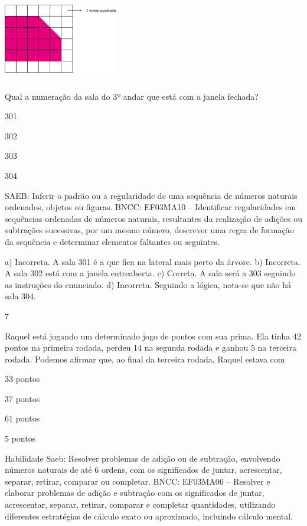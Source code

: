 \begin{multicols}{2}
{\begin{escolha}
{%

\includegraphics[width=1.96154in,height=1.44792in]{media/image108.png}

Qual a numeração da sala do 3º andar que está com a janela fechada?

\begin{escolha}
\item
  301
\item
  302
\item
  303
\item
  304
\end{escolha}

SAEB: Inferir o padrão ou a regularidade de uma sequência de
números naturais ordenados, objetos ou figuras.
BNCC: EF03MA10 -- Identificar regularidades em sequências ordenadas de números naturais,
resultantes da realização de adições ou subtrações sucessivas, por um mesmo número,
descrever uma regra de formação da sequência e determinar elementos faltantes ou seguintes.

a) Incorreta. A sala 301 é a que fica na lateral mais perto da árvore.
b) Incorreta. A sala 302 está com a janela entreaberta.
c) Correta. A sala será a 303 seguindo as instruções do enunciado.
d) Incorreta. Seguindo a lógica, nota-se que não há sala 304.

\num{7}

Raquel está jogando um determinado jogo de pontos com sua prima. Ela
tinha 42 pontos na primeira rodada, perdeu 14 na segunda rodada e ganhou
5 na terceira rodada. Podemos afirmar que, ao final da terceira rodada, Raquel estava com

\begin{escolha}
\item
  33 pontos
\item
  37 pontos
\item
  61 pontos
\item
  5 pontos
\end{escolha}

Habilidade Saeb: Resolver problemas de adição ou de subtração,
envolvendo números naturais de até 6 ordens, com os significados de
juntar, acrescentar, separar, retirar, comparar ou completar.
BNCC: EF03MA06 – Resolver e elaborar problemas de adição e subtração com os significados de
juntar, acrescentar, separar, retirar, comparar e completar quantidades, utilizando diferentes
estratégias de cálculo exato ou aproximado, incluindo cálculo mental.


}
\end{escolha}}
\end{multicols}
